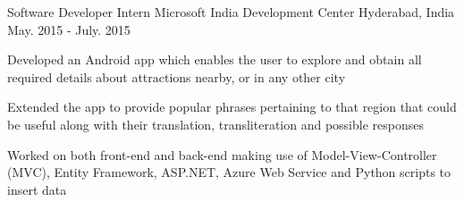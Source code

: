 \begin{cventries}
  \cventry
    {Software Developer Intern} %
    {Microsoft India Development Center} %
    {Hyderabad, India} %
    {May. 2015 - July. 2015} %
    {
      \begin{cvitems} %
        \item {Developed an Android app which enables the user to explore and obtain all required details about attractions nearby, or in any other city  }
		\item {Extended the app to provide popular phrases pertaining to that region that could be useful along with their translation, transliteration and possible responses}
		\item {Worked on both front-end and back-end making use of Model-View-Controller (MVC), Entity Framework, ASP.NET, Azure Web Service and Python scripts to insert data}
      \end{cvitems}
    }
    
  
\end{cventries}
